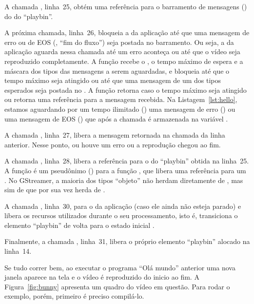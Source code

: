 \documentclass{SBCbookchapter}
\begin{document}
A chamada , linha~25, obtém uma referência para o
barramento de mensagens () do  do ``playbin''.

A próxima chamada, linha~26, bloqueia a  da aplicação até que uma
mensagem de erro ou de EOS (, ``fim do fluxo'') seja
postada no barramento.  Ou seja, a  da aplicação aguarda nessa
chamada até um erro aconteça ou até que o vídeo seja reproduzido
completamente.  A função  recebe o , o
tempo máximo de espera e a máscara dos tipos das mensagens a serem
aguardadas, e bloqueia até que o tempo máximo seja atingido ou até que uma
mensagem de um dos tipos esperados seja postada no .  A função
retorna  caso o tempo máximo seja atingido ou retorna uma referência
para a mensagem recebida.  Na Listagem~\ref{lst:hello}, estamos aguardando
por um tempo ilimitado () uma mensagem de erro
() ou uma mensagem de EOS () que
após a chamada é armazenada na variável .

A chamada , linha~27, libera a mensagem retornada na
chamada da linha anterior.  Nesse ponto, ou houve um erro ou a reprodução
chegou ao fim.

A chamada , linha~28, libera a referência para o
 do ``playbin'' obtida na linha~25.  A função  é
um pseudônimo () para a função , que libera uma
referência para um .  No GStreamer, a maioria dos tipos
``objeto'' não herdam diretamente de , mas sim de 
que por sua vez herda de .

A chamada , linha~30, para o  da
aplicação (caso ele ainda não esteja parado) e libera os recursos utilizados
durante o seu processamento, isto é, transiciona o elemento ``playbin'' de
volta para o estado inicial .

Finalmente, a chamada , linha~31, libera o próprio
elemento ``playbin'' alocado na linha~14.

Se tudo correr bem, ao executar o programa ``Olá mundo'' anterior uma nova
janela aparece na tela e o vídeo é reproduzido do inicio ao fim.
A Figura~\ref{fig:bunny} apresenta um quadro do vídeo em questão.  Para
rodar o exemplo, porém, primeiro é preciso compilá-lo.
\end{document}
